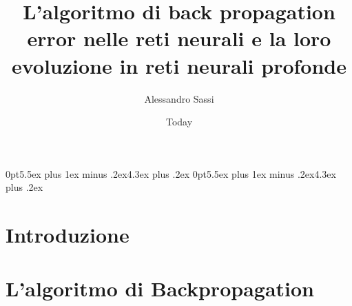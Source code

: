 \documentclass [12pt ,a4paper ,twoside ,openright ]{book}
\begin{document}
\title{L'algoritmo di back propagation error nelle reti neurali e la loro evoluzione in reti neurali profonde}
\author{Alessandro Sassi}
\date{Today}

\titlespacing*{\section}
{0pt}{5.5ex plus 1ex minus .2ex}{4.3ex plus .2ex}
\titlespacing*{\subsection}
{0pt}{5.5ex plus 1ex minus .2ex}{4.3ex plus .2ex}




\chapter*{Introduzione}

\chapter*{L'algoritmo di Backpropagation }




\end{document}
